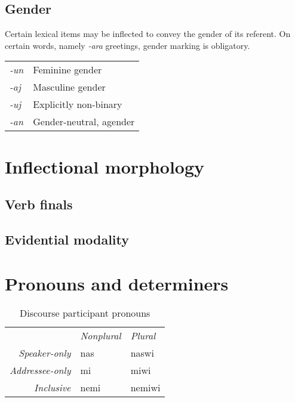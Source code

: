 \documentclass[a4paper,10pt,twoside,openright]{memoir}
\begin{document}
\subsection{Gender}

Certain lexical items may be inflected to convey the gender of its referent. On certain words, namely \emph{-ara} greetings, gender marking is obligatory.

\begin{table}[ht]
    \centering
    \begin{tabular}{>{\em}ll}
    -un & Feminine gender \\
    -aj & Masculine gender \\
    -uj & Explicitly non-binary \\
    -an & Gender-neutral, agender \\
    \end{tabular}
\end{table}



\section{Inflectional morphology}

\subsection{Verb finals}

\subsection{Evidential modality}

\section{Pronouns and determiners}

\begin{table}[ht]
    \centering
    \begin{tabular}{rll}
        & \textit{Nonplural} & \textit{Plural} \\
    \textit{Speaker-only} & nas & naswi \\
    \textit{Addressee-only} & mi & miwi \\
    \textit{Inclusive} & nemi & nemiwi \\
    \end{tabular}
    \caption{Discourse participant pronouns}
    \label{tab:firstandsecond}
\end{table}
\end{document}
